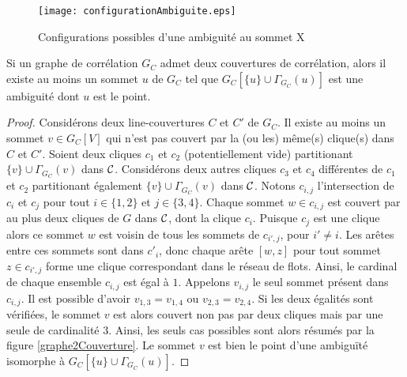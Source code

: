 	\begin{centering}\vspace{-0.5em}
	\begin{figure}[htb!]\vspace{-0.5em}
	\texttt{[image: configurationAmbiguite.eps]}\vspace{-0.5em}
	\caption{ Configurations possibles d'une ambiguit\'e au sommet X }\vspace{-0.5em}
	\label{configurationAmbiguite}
	\end{figure}
	\end{centering}
	
	\begin{lemma}
	Si un graphe de corr\'elation $G_C$ admet deux couvertures de corr\'elation, alors il existe au moins un sommet $u$ de $G_C$ tel que $G_{C}[\{u\} \cup \Gamma_{G_C}(u)]$ est une ambiguit\'e dont $u$ est le point.
	\end{lemma}
	
	\begin{proof} 
		Consid\'erons deux line-couvertures $C$ et $C'$ de $G_C$. 
		Il existe au moins un sommet $v \in G_C[V]$ qui n'est pas couvert par la (ou les) m\^eme(s) clique(s) dans $C$ et $C'$.
		Soient deux cliques $c_1$ et $c_2$ (potentiellement vide) partitionant $\{v\} \cup \Gamma_{G_C}(v)$ dans $\cal C$.
		Consid\'erons deux autres cliques $c_3$ et $c_4$ diff\'erentes de $c_1$ et $c_2$ partitionant \'egalement $\{v\} \cup \Gamma_{G_C}(v)$ dans $\cal C$. \newline
		Notons $c_{i,j}$ l'intersection de $c_{i}$ et $c_j$ pour tout $i \in \{1,2\}$ et $j \in \{3,4\}$. 
		Chaque sommet $w \in c_{i,j}$ est couvert par au plus deux cliques de $G$ dans $\cal C$, dont la clique $c_i$.
		Puisque $c_j$ est une clique alors ce sommet $w$ est voisin de tous les sommets de  $c_{i',j}$, pour $i' \ne i$.
		Les ar\^etes entre ces sommets sont dans $c'_i$, donc chaque ar\^ete $[w,z]$ pour tout sommet  $z \in c_{i',j}$ forme une clique correspondant dans le r\'eseau de flots.
		Ainsi, le cardinal de chaque ensemble  $c_{i,j}$ est \'egal \`a $1$.\newline
		Appelons $v_{i,j}$ le seul sommet pr\'esent dans $c_{i,j}$. 
		Il est possible d'avoir $v_{1,3} = v_{1,4}$ ou $v_{2,3} = v_{2,4}$.
		Si les deux \'egalit\'es sont v\'erifi\'ees, le sommet $v$ est alors couvert non pas par deux cliques mais par une seule de cardinalit\'e $3$.
		Ainsi, les seuls cas possibles sont alors r\'esum\'es par la figure  \ref{graphe2Couverture}.
		Le sommet $v$ est bien le point d'une ambigu\"{i}t\'e isomorphe \`a $G_C[\{u\} \cup \Gamma_{G_C}(u)]$.
	\end{proof}

